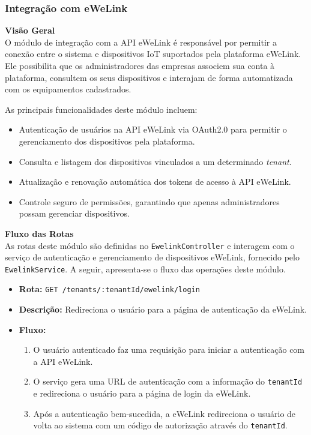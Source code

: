 \subsubsection{Integração com eWeLink}\label{subsubsec:integacao_ewelink}

\textbf{Visão Geral} \\
O módulo de integração com a API eWeLink é responsável por permitir a conexão entre o sistema e dispositivos IoT suportados pela plataforma eWeLink. Ele possibilita que os administradores das empresas associem sua conta à plataforma, consultem os seus dispositivos e interajam de forma automatizada com os equipamentos cadastrados.

As principais funcionalidades deste módulo incluem:

\begin{itemize}
    \item Autenticação de usuários na API eWeLink via OAuth2.0 para permitir o gerenciamento dos dispositivos pela plataforma.
    \item Consulta e listagem dos dispositivos vinculados a um determinado \textit{tenant}.
    \item Atualização e renovação automática dos tokens de acesso à API eWeLink.
    \item Controle seguro de permissões, garantindo que apenas administradores possam gerenciar dispositivos.
\end{itemize}

\textbf{Fluxo das Rotas} \\
As rotas deste módulo são definidas no \texttt{EwelinkController} e interagem com o serviço de autenticação e gerenciamento de dispositivos eWeLink, fornecido pelo \texttt{EwelinkService}. A seguir, apresenta-se o fluxo das operações deste módulo.

\begin{itemize}
    \item \textbf{Rota:} \texttt{GET /tenants/:tenantId/ewelink/login}
    \item \textbf{Descrição:} Redireciona o usuário para a página de autenticação da eWeLink.
    \item \textbf{Fluxo:}
    \begin{enumerate}
        \item O usuário autenticado faz uma requisição para iniciar a autenticação com a API eWeLink.
        \item O serviço gera uma URL de autenticação com a informação do \texttt{tenantId} e redireciona o usuário para a página de login da eWeLink.
        \item Após a autenticação bem-sucedida, a eWeLink redireciona o usuário de volta ao sistema com um código de autorização através do \texttt{tenantId}.
    \end{enumerate}
\end{itemize}

